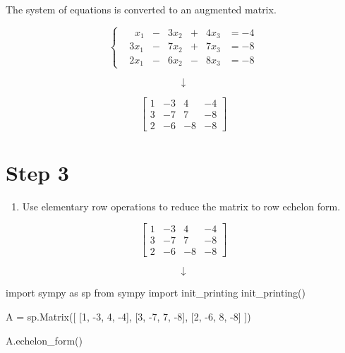 \documentclass[
  letterpaper,
  DIV=11,
  numbers=noendperiod]{scrreprt}
\newenvironment{Shaded}{\begin{snugshade}}{\end{snugshade}}
\newcommand{\DecValTok}[1]{\textcolor[rgb]{0.68,0.00,0.00}{#1}}
\newcommand{\ImportTok}[1]{\textcolor[rgb]{0.00,0.46,0.62}{#1}}
\newcommand{\NormalTok}[1]{\textcolor[rgb]{0.00,0.23,0.31}{#1}}
\newcommand{\OperatorTok}[1]{\textcolor[rgb]{0.37,0.37,0.37}{#1}}
\providecommand{\tightlist}{%
  \setlength{\itemsep}{0pt}\setlength{\parskip}{0pt}}\usepackage{longtable,booktabs,array}
\begin{document}
The system of equations is converted to an augmented matrix.

\[
\begin{cases}
&\;\;x_1 &- &3x_2 &+ &4x_3 &= -4 \\
&3x_1 &- &7x_2 &+ &7x_3 &= -8 \\
&2x_1 &- &6x_2 &- &8x_3 &= -8
\end{cases}
\]

\[
\downarrow
\]

\[
\left[\begin{array}{ccc|c}
1 & -3 & 4 & -4 \\
3 & -7 & 7 & -8 \\
2 & -6 & -8 & -8
\end{array}\right]
\]

\chapter{Step 3}

\begin{enumerate}
\def\labelenumi{\arabic{enumi}.}
\setcounter{enumi}{2}
\tightlist
\item
  Use elementary row operations to reduce the matrix to row echelon
  form.
\end{enumerate}

\[
\left[\begin{array}{ccc|c}
1 & -3 & 4 & -4 \\
3 & -7 & 7 & -8 \\
2 & -6 & -8 & -8
\end{array}\right]
\]

\[
\downarrow
\]

\begin{Shaded}
\begin{Highlighting}[]
\ImportTok{import}\NormalTok{ sympy }\ImportTok{as}\NormalTok{ sp}
\ImportTok{from}\NormalTok{ sympy }\ImportTok{import}\NormalTok{ init\_printing}
\NormalTok{init\_printing()}

\NormalTok{A }\OperatorTok{=}\NormalTok{ sp.Matrix([}
\NormalTok{    [}\DecValTok{1}\NormalTok{, }\OperatorTok{{-}}\DecValTok{3}\NormalTok{, }\DecValTok{4}\NormalTok{, }\OperatorTok{{-}}\DecValTok{4}\NormalTok{],}
\NormalTok{    [}\DecValTok{3}\NormalTok{, }\OperatorTok{{-}}\DecValTok{7}\NormalTok{, }\DecValTok{7}\NormalTok{, }\OperatorTok{{-}}\DecValTok{8}\NormalTok{],}
\NormalTok{    [}\DecValTok{2}\NormalTok{, }\OperatorTok{{-}}\DecValTok{6}\NormalTok{, }\DecValTok{8}\NormalTok{, }\OperatorTok{{-}}\DecValTok{8}\NormalTok{]}
\NormalTok{])}

\NormalTok{A.echelon\_form()}
\end{Highlighting}
\end{Shaded}
\end{document}
